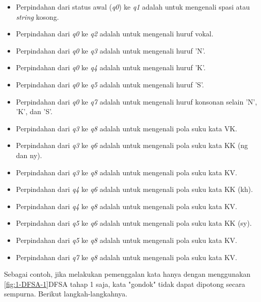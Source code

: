 \begin{itemize}
	\item Perpindahan dari status awal (\textit{q0}) ke \textit{q1} adalah untuk mengenali spasi atau \textit{string} kosong.
	\item Perpindahan dari \textit{q0} ke \textit{q2} adalah untuk mengenali huruf vokal.
	\item Perpindahan dari \textit{q0} ke \textit{q3} adalah untuk mengenali huruf 'N'.
	\item Perpindahan dari \textit{q0} ke \textit{q4} adalah untuk mengenali huruf 'K'.
	\item Perpindahan dari \textit{q0} ke \textit{q5} adalah untuk mengenali huruf 'S'.
	\item Perpindahan dari \textit{q0} ke \textit{q7} adalah untuk mengenali huruf konsonan selain 'N', 'K', dan 'S'.
	\item Perpindahan dari \textit{q3} ke \textit{q8} adalah untuk mengenali pola suku kata VK.
	\item Perpindahan dari \textit{q3} ke \textit{q6} adalah untuk mengenali pola suku kata KK (ng dan ny).
	\item Perpindahan dari \textit{q3} ke \textit{q8} adalah untuk mengenali pola suku kata KV.
	\item Perpindahan dari \textit{q4} ke \textit{q6} adalah untuk mengenali pola suku kata KK (kh).
	\item Perpindahan dari \textit{q4} ke \textit{q8} adalah untuk mengenali pola suku kata KV.
	\item Perpindahan dari \textit{q5} ke \textit{q6} adalah untuk mengenali pola suku kata KK (sy).
	\item Perpindahan dari \textit{q5} ke \textit{q8} adalah untuk mengenali pola suku kata KV.
	\item Perpindahan dari \textit{q7} ke \textit{q8} adalah untuk mengenali pola suku kata KV.
\end{itemize}

Sebagai contoh, jika melakukan pemenggalan kata hanya dengan menggunakan \ref{fig:1-DFSA-1}DFSA tahap 1 saja, kata "gondok" tidak dapat dipotong secara sempurna. Berikut langkah-langkahnya.

